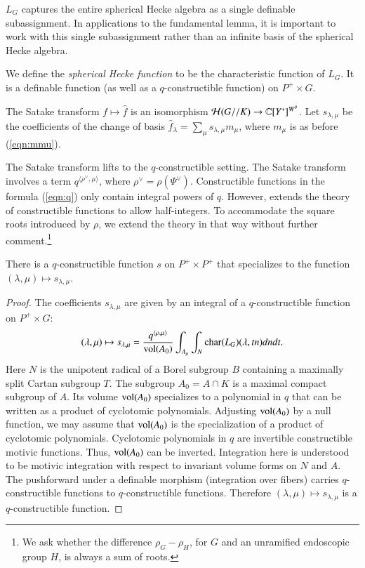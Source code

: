 \begin{remark}   
  $L_G$ captures the entire spherical Hecke algebra as a single
  definable subassignment.  In applications to the fundamental lemma,
  it is important to work with this single subassignment rather than
  an infinite basis of the spherical Hecke algebra.
\end{remark}

We define the {\it spherical Hecke function} to be the characteristic
function of $L_G$.  It is a definable function (as well as a
$q$-constructible function) on $P^+\times G$.

The Satake transform $f\mapsto \hat f$ is an
isomorphism $\mathcal H(G//K)\to\mathbb{C}[Y^*]^{W^\theta}$.  Let
$s_{\lambda,\mu}$ be the coefficients of the change of basis $\hat
f_\lambda = \sum_\mu s_{\lambda,\mu} m_\mu$,
where $m_\mu$ is as before (\ref{eqn:mmu}).

The Satake transform lifts to the $q$-constructible setting.  The
Satake transform involves a term $q^{\langle\rho^\vee,\mu\rangle}$,
where $\rho^\vee = \rho(\Psi^\vee)$.  Constructible functions in the
formula (\ref{eqn:q}) only contain integral powers of $q$.  However,
\cite[\S B.3.1]{cluckers2011local} extends the theory of constructible
functions to allow half-integers.  To accommodate the square roots
introduced by $\rho$, we extend the theory in that way without further
comment.\footnote{We ask whether the difference $\rho_G - \rho_H$,
  for $G$ and an unramified endoscopic group $H$, is always a sum of
  roots.}

\begin{lemma}\label{lemma:satake} 
  There is a $q$-constructible function $s$ on $P^+\times P^+$ that
  specializes to the function $(\lambda,\mu)\mapsto s_{\lambda,\mu}$.
\end{lemma}

\begin{proof} 
  The coefficients $s_{\lambda,\mu}$ are given by an integral of a
  $q$-constructible function on $P^+\times G$:
\begin{equation}\label{eqn:s}
(\lambda,\mu)\mapsto s_{\lambda,\mu}
=\frac{q^{\langle\rho,\mu\rangle}}{{\operatorname{vol}}(A_0)} 
\int_{A_\mu} \int_N {\operatorname{char}}(L_G)(\lambda,t n) dn dt.
\end{equation}
Here $N$ is the unipotent radical of a Borel subgroup $B$ containing a
maximally split Cartan subgroup $T$.  The subgroup $A_0 = A\cap K$ is
a maximal compact subgroup of $A$.  Its volume ${\operatorname{vol}}(A_0)$
specializes to a polynomial in $q$ that can be written as a product of
cyclotomic polynomials.  Adjusting ${\operatorname{vol}}(A_0)$ by a null function,
we may assume that ${\operatorname{vol}}(A_0)$ is the specialization of a product
of cyclotomic polynomials.  Cyclotomic polynomials in $q$ are invertible
constructible motivic functions.  Thus, ${\operatorname{vol}}(A_0)$ can be
inverted.  Integration here is understood to be motivic integration
with respect to invariant volume forms on $N$ and $A$.  The
pushforward under a definable morphism (integration over fibers)
carries $q$-constructible functions to $q$-constructible functions.
Therefore $(\lambda,\mu)\mapsto s_{\lambda,\mu}$ is a
$q$-constructible function.
\end{proof}


